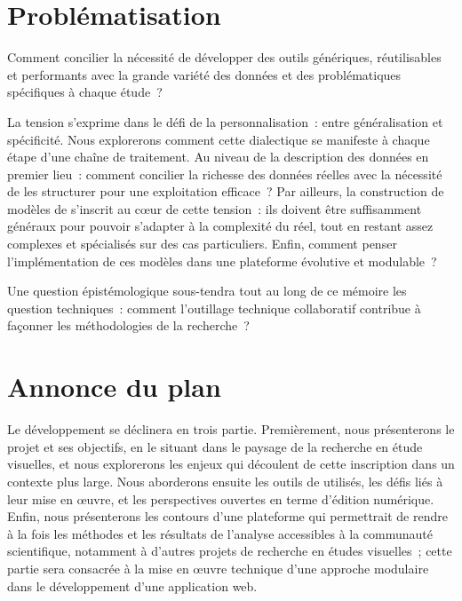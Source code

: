 \section{Problématisation}

Comment concilier la nécessité de développer des outils génériques, réutilisables et performants avec la grande variété des données et des problématiques spécifiques à chaque étude~?

La tension s'exprime dans le défi de la personnalisation~: entre généralisation et spécificité. Nous explorerons comment cette dialectique se manifeste à chaque étape d'une chaîne de traitement. Au niveau de la description des données en premier lieu~: comment concilier la richesse des données réelles avec la nécessité de les structurer pour une exploitation efficace~? Par ailleurs, la construction de modèles de \cv s'inscrit au cœur de cette tension~: ils doivent être suffisamment généraux pour pouvoir s'adapter à la complexité du réel, tout en restant assez complexes et spécialisés sur des cas particuliers. Enfin, comment penser l'implémentation de ces modèles dans une plateforme évolutive et modulable~? 

Une question épistémologique sous-tendra tout au long de ce mémoire les question techniques~: comment l'outillage technique collaboratif contribue à façonner les méthodologies de la recherche~? 

\section{Annonce du plan}

Le développement se déclinera en trois partie. Premièrement, nous présenterons le projet \eida et ses objectifs, en le situant dans le paysage de la recherche en étude visuelles, et nous explorerons les enjeux qui découlent de cette inscription dans un contexte plus large. Nous aborderons ensuite les outils de \cv utilisés, les défis liés à leur mise en œuvre, et les perspectives ouvertes en terme d'édition numérique. Enfin, nous présenterons les contours d'une plateforme qui permettrait de rendre à la fois les méthodes et les résultats de l'analyse accessibles à la communauté scientifique, notamment à d'autres projets de recherche en études visuelles~; cette partie sera consacrée à la mise en œuvre technique d'une approche modulaire dans le développement d'une application web. 
